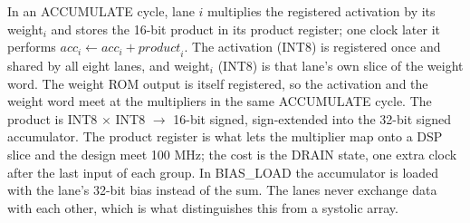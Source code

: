 \documentclass[10pt,a4paper]{article}
\begin{document}
\begin{landscape}
\begin{center}
{}
\end{center}

In an ACCUMULATE cycle, lane $i$ multiplies the registered activation by its weight$_i$ and stores the 16-bit product in its product register; one clock later it performs
$\mathit{acc}_i \leftarrow \mathit{acc}_i + \mathit{product}_i$.
The activation (INT8) is registered once and shared by all eight lanes, and weight$_i$ (INT8) is that lane's own slice of the weight word. The weight ROM output is itself registered, so the activation and the weight word meet at the multipliers in the same ACCUMULATE cycle.
The product is INT8 $\times$ INT8 $\to$ 16-bit signed, sign-extended into the 32-bit signed accumulator.
The product register is what lets the multiplier map onto a DSP slice and the design meet 100 MHz; the cost is the DRAIN state, one extra clock after the last input of each group.
In BIAS_LOAD the accumulator is loaded with the lane's 32-bit bias instead of the sum.
The lanes never exchange data with each other, which is what distinguishes this from a systolic array.

\end{landscape}
\end{document}
